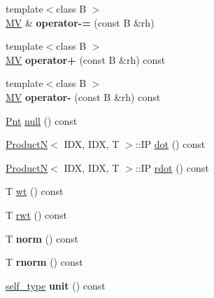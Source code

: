 \begin{DoxyCompactItemize}
\item 
\hypertarget{classvsr_1_1_m_v_a359775b04e78658a6351b67a0644ac9d}{{\footnotesize template$<$class B $>$ }\\\hyperlink{classvsr_1_1_m_v}{M\-V} \& {\bfseries operator-\/=} (const B \&rh)}\label{classvsr_1_1_m_v_a359775b04e78658a6351b67a0644ac9d}

\item 
\hypertarget{classvsr_1_1_m_v_a337cae642ffbdcbfb3f2232d1df02926}{{\footnotesize template$<$class B $>$ }\\\hyperlink{classvsr_1_1_m_v}{M\-V} {\bfseries operator+} (const B \&rh) const }\label{classvsr_1_1_m_v_a337cae642ffbdcbfb3f2232d1df02926}

\item 
\hypertarget{classvsr_1_1_m_v_a79d2f590a4ded6be7a9c96b5a9f55e3d}{{\footnotesize template$<$class B $>$ }\\\hyperlink{classvsr_1_1_m_v}{M\-V} {\bfseries operator-\/} (const B \&rh) const }\label{classvsr_1_1_m_v_a79d2f590a4ded6be7a9c96b5a9f55e3d}

\item 
\hyperlink{namespacevsr_a2d05beb9721c5d9211b479af6d47222d}{Pnt} \hyperlink{classvsr_1_1_m_v_a7df5f2cf13d22924fa7884c5d4e42cd9}{null} () const 
\item 
\hyperlink{structvsr_1_1_product_n}{Product\-N}$<$ I\-D\-X, I\-D\-X, T $>$\-::I\-P \hyperlink{classvsr_1_1_m_v_ac4928a840ce8c0ef00cd92e69079e5bc}{dot} () const 
\item 
\hyperlink{structvsr_1_1_product_n}{Product\-N}$<$ I\-D\-X, I\-D\-X, T $>$\-::I\-P \hyperlink{classvsr_1_1_m_v_a563c968336046d14d0de18585aef87ec}{rdot} () const 
\item 
T \hyperlink{classvsr_1_1_m_v_a5f1a10a9cd0ce79150688d75d117875a}{wt} () const 
\item 
T \hyperlink{classvsr_1_1_m_v_a04896bb340cb5dc4f6b298361eca9f06}{rwt} () const 
\item 
\hypertarget{classvsr_1_1_m_v_a3bbfd76b2738733f4822f464a0edd4c5}{T {\bfseries norm} () const }\label{classvsr_1_1_m_v_a3bbfd76b2738733f4822f464a0edd4c5}

\item 
\hypertarget{classvsr_1_1_m_v_a22882e4e4d38dc31142d05c831f192aa}{T {\bfseries rnorm} () const }\label{classvsr_1_1_m_v_a22882e4e4d38dc31142d05c831f192aa}

\item 
\hypertarget{classvsr_1_1_m_v_a94cd2a5f8227f0aedc419ff74202c71b}{\hyperlink{classvsr_1_1_m_v}{self\-\_\-type} {\bfseries unit} () const }\label{classvsr_1_1_m_v_a94cd2a5f8227f0aedc419ff74202c71b}


\end{DoxyCompactItemize}
